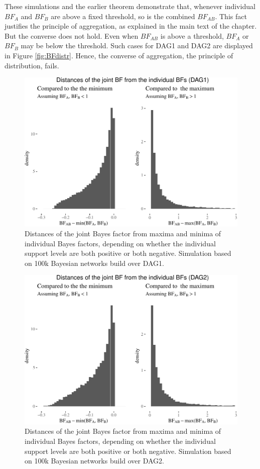 \documentclass[
  10pt,
  dvipsnames,enabledeprecatedfontcommands]{scrartcl}
\begin{document}
These simulations and the earlier theorem demonstrate that, whenever
individual \(BF_A\) and \(BF_B\) are above a fixed threshold, so is the
combined \(BF_{AB}\). This fact justifies the principle of aggregation,
as explained in the main text of the chapter. But the converse does not
hold. Even when \(BF_{AB}\) is above a threshold, \(BF_A\) or \(BF_B\)
may be below the threshold. Such cases for \textsf{DAG1} and
\textsf{DAG2} are displayed in Figure \ref{fig:BFdistr}. Hence, the
converse of aggregation, the principle of distribution, fails.

\begin{figure}

\begin{center}\includegraphics[width=0.7\linewidth]{conjunction-appendix14_files/figure-latex/BFind-1} \end{center}
\caption{Distances of the joint Bayes factor from maxima and minima of individual Bayes factors, depending on whether the individual support levels are both positive or both negative. Simulation based on 100k Bayesian networks build over \textsf{DAG1}.}
\label{fig:DAG1BF}
\end{figure}

\begin{figure}

\begin{center}\includegraphics[width=0.7\linewidth]{conjunction-appendix14_files/figure-latex/BFind2-1} \end{center}

\caption{Distances of the joint Bayes factor from maxima and minima of individual Bayes factors, depending on whether the individual support levels are both positive or both negative. Simulation based on 100k Bayesian networks build over \textsf{DAG2}.}
\label{fig:BFind2}
\end{figure}
\end{document}
